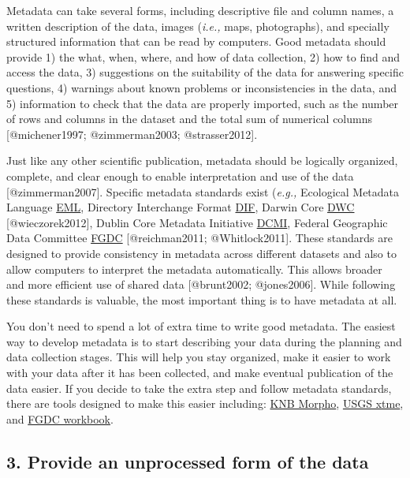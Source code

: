 Metadata can take several forms, including descriptive file and column
names, a written description of the data, images (\emph{i.e.,} maps,
photographs), and specially structured information that can be read by
computers. Good metadata should provide 1) the what, when, where, and
how of data collection, 2) how to find and access the data, 3)
suggestions on the suitability of the data for answering specific
questions, 4) warnings about known problems or inconsistencies in the
data, and 5) information to check that the data are properly imported,
such as the number of rows and columns in the dataset and the total sum
of numerical columns {[}@michener1997; @zimmerman2003; @strasser2012{]}.

Just like any other scientific publication, metadata should be logically
organized, complete, and clear enough to enable interpretation and use
of the data {[}@zimmerman2007{]}. Specific metadata standards exist
(\emph{e.g.,} Ecological Metadata Language
\href{http://knb.ecoinformatics.org/software/eml/}{EML}, Directory
Interchange Format
\href{http://gcmd.gsfc.nasa.gov/add/difguide/index.html}{DIF}, Darwin
Core \href{http://rs.tdwg.org/dwc/}{DWC} {[}@wieczorek2012{]}, Dublin
Core Metadata Initiative
\href{http://dublincore.org/metadata-basics/}{DCMI}, Federal Geographic
Data Committee
\href{http://www.fgdc.gov/metadata/geospatial-metadata-standards}{FGDC}
{[}@reichman2011; @Whitlock2011{]}. These standards are designed to
provide consistency in metadata across different datasets and also to
allow computers to interpret the metadata automatically. This allows
broader and more efficient use of shared data {[}@brunt2002;
@jones2006{]}. While following these standards is valuable, the most
important thing is to have metadata at all.

You don't need to spend a lot of extra time to write good metadata. The
easiest way to develop metadata is to start describing your data during
the planning and data collection stages. This will help you stay
organized, make it easier to work with your data after it has been
collected, and make eventual publication of the data easier. If you
decide to take the extra step and follow metadata standards, there are
tools designed to make this easier including:
\href{http://knb.ecoinformatics.org/morpho\%20portal.jsp}{KNB Morpho},
\href{http://geology.usgs.gov/tools/metadata/tools/doc/xtme.html}{USGS
xtme}, and
\href{http://www.fgdc.gov/metadata/documents/workbook_0501_bmk.pdf}{FGDC
workbook}.

\subsection{3. Provide an unprocessed form of the
data}\label{provide-an-unprocessed-form-of-the-data}

